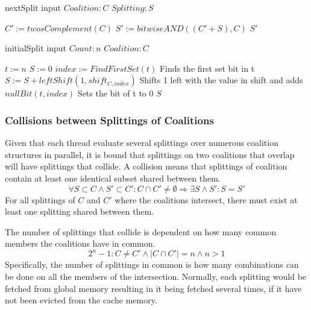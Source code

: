 \documentclass{llncs}
\begin{document}
\begin{algorithm}
\caption{ nextSplit input $Coalition:C$ $Splitting:S$\label{alg:nextsplit}}
\begin{algorithmic}[1]
\STATE $C' := twosComplement(C)$
\STATE $S' := bitwiseAND((C'+S),C)$
\RETURN $S'$
\end{algorithmic}
\end{algorithm}

\begin{algorithm}
\caption{initialSplit input $Count:n$ $Coalition:C$\label{alg:initalsplit}}
\begin{algorithmic}[1]
\STATE $t := n$
\STATE $S := 0$
 { 
\STATE $index := FindFirstSet(t)$ \hfill Finds the first set bit in t
\STATE $S := S + leftShift(1,shift_{C,index})$ \hfill Shifts 1 left with the value in shift and adds
\STATE $nullBit(t,index)$ \hfill Sets the bit of t to 0
}
\ENDWHILE
\RETURN $S$
\end{algorithmic}
\end{algorithm}

\subsubsection{Collisions between Splittings of Coalitions} \label{sectionsplit}
Given that each thread evaluate several splittings over numerous coalition structures in parallel, 
it is bound that splittings on two coalitions that overlap will have splittings that collide.
A collision means that splittings of coalition contain at least one identical subset shared between them.
\begin{displaymath}\forall S\subset C \wedge S' \subset C' : C \cap C' \neq \emptyset \Rightarrow \exists S \wedge S' : S = S'\end{displaymath}
For all splittings of $C$ and $C'$ where the coalitions intersect, there must exist at least one splitting shared between them.

The number of splittings that collide is dependent on how many common members the coalitions have in common.
\begin{displaymath}2^{n}-1:C\neq C'\wedge |C \cap C'| = n \wedge n > 1 \end{displaymath}
Specifically, the number of splittings in common is how many combinations
can be done on all the members of the intersection. Normally, each splitting would be fetched from global memory resulting in it being fetched several times, if it have not been evicted from the cache memory.
\end{document}
